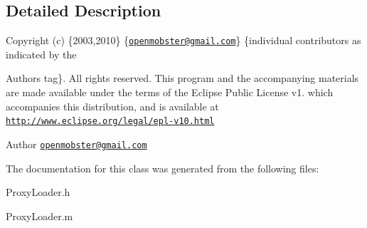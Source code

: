 \subsection{\-Detailed \-Description}
\-Copyright (c) \{2003,2010\} \{\href{mailto:openmobster@gmail.com}{\tt openmobster@gmail.\-com}\} \{individual contributors as indicated by the \begin{DoxyAuthor}{\-Authors}
tag\}. \-All rights reserved. \-This program and the accompanying materials are made available under the terms of the \-Eclipse \-Public \-License v1. which accompanies this distribution, and is available at \href{http://www.eclipse.org/legal/epl-v10.html}{\tt http\-://www.\-eclipse.\-org/legal/epl-\/v10.\-html}
\end{DoxyAuthor}
\begin{DoxyAuthor}{\-Author}
\href{mailto:openmobster@gmail.com}{\tt openmobster@gmail.\-com} 
\end{DoxyAuthor}


\-The documentation for this class was generated from the following files\-:\begin{DoxyCompactItemize}
\item 
\-Proxy\-Loader.\-h\item 
\-Proxy\-Loader.\-m\end{DoxyCompactItemize}
